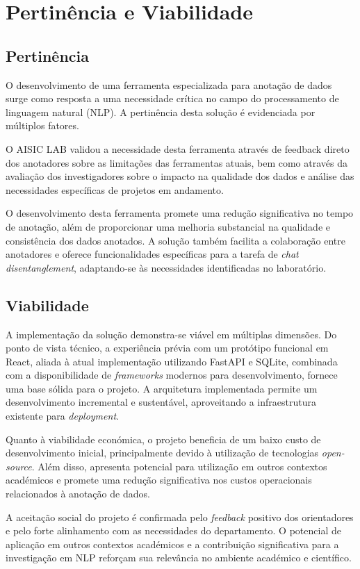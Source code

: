 \chapter{Pertinência e Viabilidade}

\section{Pertinência}
O desenvolvimento de uma ferramenta especializada para anotação de dados surge como resposta a uma necessidade crítica no campo do processamento de linguagem natural (NLP). A pertinência desta solução é evidenciada por múltiplos fatores.

O AISIC LAB validou a necessidade desta ferramenta através de feedback direto dos anotadores sobre as limitações das ferramentas atuais, bem como através da avaliação dos investigadores sobre o impacto na qualidade dos dados e análise das necessidades específicas de projetos em andamento.

O desenvolvimento desta ferramenta promete uma redução significativa no tempo de anotação, além de proporcionar uma melhoria substancial na qualidade e consistência dos dados anotados. A solução também facilita a colaboração entre anotadores e oferece funcionalidades específicas para a tarefa de \textit{chat disentanglement}, adaptando-se às necessidades identificadas no laboratório.

\section{Viabilidade}
A implementação da solução demonstra-se viável em múltiplas dimensões. Do ponto de vista técnico, a experiência prévia com um protótipo funcional em React, aliada à atual implementação utilizando FastAPI e SQLite, combinada com a disponibilidade de \textit{frameworks} modernos para desenvolvimento, fornece uma base sólida para o projeto. A arquitetura implementada permite um desenvolvimento incremental e sustentável, aproveitando a infraestrutura existente para \textit{deployment}.

Quanto à viabilidade económica, o projeto beneficia de um baixo custo de desenvolvimento inicial, principalmente devido à utilização de tecnologias \textit{open-source}. Além disso, apresenta potencial para utilização em outros contextos académicos e promete uma redução significativa nos custos operacionais relacionados à anotação de dados.

A aceitação social do projeto é confirmada pelo \textit{feedback} positivo dos orientadores e pelo forte alinhamento com as necessidades do departamento. O potencial de aplicação em outros contextos académicos e a contribuição significativa para a investigação em NLP reforçam sua relevância no ambiente académico e científico.

